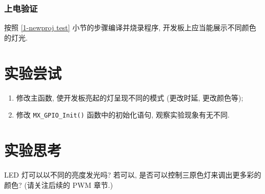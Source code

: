 \subsubsection{上电验证}
按照 \ref{1-newproj test} 小节的步骤编译并烧录程序, 开发板上应当能展示不同颜色的灯光.

\section{实验尝试}
\begin{enumerate}[(1)]
    \item 修改主函数, 使开发板亮起的灯呈现不同的模式 (更改时延, 更改颜色等);
    \item 修改 \texttt{MX\_GPIO\_Init()} 函数中的初始化语句, 观察实验现象有无不同.
\end{enumerate}

\section{实验思考}
LED 灯可以以不同的亮度发光吗? 若可以, 是否可以控制三原色灯来调出更多彩的颜色? (请关注后续的 PWM 章节.)
